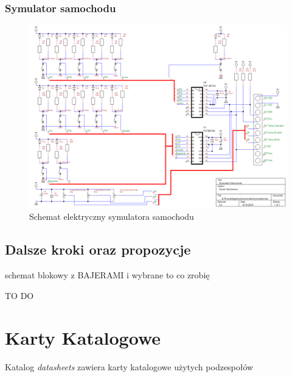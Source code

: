 \documentclass{xmgr}
\begin{document}
\subsection{Symulator samochodu}
\begin{figure}[!p]
    \centering
    \includegraphics[height=0.6\textheight]{images/symulator.png}
    \caption{Schemat elektryczny symulatora samochodu}
\end{figure}

\section{Dalsze kroki oraz propozycje}
schemat blokowy z BAJERAMI i wybrane to co zrobię

\summary
TO DO

\appendix
\chapter{Karty Katalogowe}
Katalog \emph{datasheets} zawiera karty katalogowe użytych podzespołów
\end{document}
